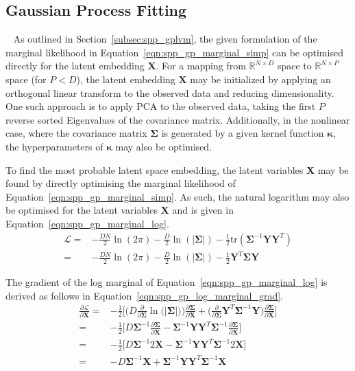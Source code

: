 \subsection{Gaussian Process Fitting}
~\label{subsubsec:spp_gp_fitting}
As outlined in Section~\ref{subsec:spp_gplvm}, the given formulation of the marginal likelihood 
in Equation~\ref{eqn:spp_gp_marginal_simp} can be optimised directly for the latent embedding 
\( \bm{X} \). For a mapping from \(\mathbb{R}^{N \times D} \) space to \(\mathbb{R}^{N \times P} \)
space (for \( P < D \)), the latent embedding \( \bm{X} \) may be initialized by applying an 
orthogonal linear transform to the observed data and reducing dimensionality. One such approach 
is to apply PCA to the observed data, taking the first \(P\) reverse sorted Eigenvalues of the 
covariance matrix. Additionally, in the nonlinear case, where the covariance matrix \( \bm{\Sigma} \) 
is generated by a given kernel function \( \bm{\kappa} \), the hyperparameters of \( \bm{\kappa} \) may 
also be optimised.

To find the most probable latent space embedding, the latent variables \( \bm{X} \) may be 
found by directly optimising the marginal likelihood of Equation~\ref{eqn:spp_gp_marginal_simp}. 
As such, the natural logarithm may also be optimised for the latent variables \( \bm{X} \) and 
is given in Equation~\ref{eqn:spp_gp_marginal_log}.
\begin{align}
  \label{eqn:spp_gp_marginal_log}
  \mathcal{L} ={}& -\frac{DN}{2} \ln(2\pi)
  -\frac{D}{2} \ln(\left| \bm{\Sigma} \right|)
  -\frac{1}{2} \text{tr}(\bm{\Sigma}^{-1} \bm{YY}^{T})\\
  ={}& -\frac{DN}{2} \ln(2\pi)
  -\frac{D}{2} \ln(\left| \bm{\Sigma} \right|)
  -\frac{1}{2} \bm{Y}^{T}\bm{\Sigma}\bm{Y}
\end{align}

The gradient of the log marginal of Equation~\ref{eqn:spp_gp_marginal_log} 
is derived as follows in Equation~\ref{eqn:spp_gp_log_marginal_grad}.
\begin{align}
  \label{eqn:spp_gp_log_marginal_grad}
  \frac{\partial \mathcal{L}}{\partial \bm{X}} ={}&
  -\frac{1}{2} \Bigg[
    \Big( D \frac{\partial}{\partial \bm{\Sigma}} 
    \ln \big( \left| \bm{\Sigma} \right| \big) \Big) 
    \frac{\partial \bm{\Sigma}}{\partial \bm{X}}
    + \Big( \frac{\partial}{\partial \bm{\Sigma}}
    \bm{Y}^{T} \bm{\Sigma}^{-1} \bm{Y} \Big)
    \frac{\partial \bm{\Sigma}}{\partial \bm{X}}
  \Bigg]\\
  ={}& -\frac{1}{2} \Bigg[
    D \bm{\Sigma}^{-1} \frac{\partial \bm{\Sigma}}{\partial \bm{X}}
    - \bm{\Sigma}^{-1} \bm{YY}^{T} \bm{\Sigma}^{-1} 
    \frac{\partial \bm{\Sigma}}{\partial \bm{X}}
  \Bigg]\\
  ={}& -\frac{1}{2} \Bigg[
    D \bm{\Sigma}^{-1} 2 \bm{X}
    - \bm{\Sigma}^{-1} \bm{YY}^{T} \bm{\Sigma}^{-1} 2 \bm{X}
  \Bigg]\\
  ={}& -D \bm{\Sigma}^{-1} \bm{X}
  + \bm{\Sigma}^{-1} \bm{YY}^{T} \bm{\Sigma}^{-1} \bm{X}
\end{align}

